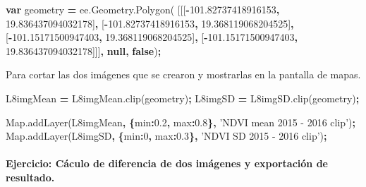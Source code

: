 \documentclass[
]{article}
\newenvironment{Shaded}{\begin{snugshade}}{\end{snugshade}}
\newcommand{\AttributeTok}[1]{\textcolor[rgb]{0.77,0.63,0.00}{#1}}
\newcommand{\DataTypeTok}[1]{\textcolor[rgb]{0.13,0.29,0.53}{#1}}
\newcommand{\DecValTok}[1]{\textcolor[rgb]{0.00,0.00,0.81}{#1}}
\newcommand{\FloatTok}[1]{\textcolor[rgb]{0.00,0.00,0.81}{#1}}
\newcommand{\KeywordTok}[1]{\textcolor[rgb]{0.13,0.29,0.53}{\textbf{#1}}}
\newcommand{\NormalTok}[1]{#1}
\newcommand{\OperatorTok}[1]{\textcolor[rgb]{0.81,0.36,0.00}{\textbf{#1}}}
\newcommand{\StringTok}[1]{\textcolor[rgb]{0.31,0.60,0.02}{#1}}
\newcommand{\VariableTok}[1]{\textcolor[rgb]{0.00,0.00,0.00}{#1}}
\begin{document}
\begin{Shaded}
\begin{Highlighting}[]
\KeywordTok{var}\NormalTok{ geometry }\OperatorTok{=} \VariableTok{ee}\NormalTok{.}\VariableTok{Geometry}\NormalTok{.}\AttributeTok{Polygon}\NormalTok{(}
\NormalTok{        [[[}\OperatorTok{-}\FloatTok{101.82737418916153}\OperatorTok{,} \FloatTok{19.836437094032178}\NormalTok{]}\OperatorTok{,}
\NormalTok{          [}\OperatorTok{-}\FloatTok{101.82737418916153}\OperatorTok{,} \FloatTok{19.368119068204525}\NormalTok{]}\OperatorTok{,}
\NormalTok{          [}\OperatorTok{-}\FloatTok{101.15171500947403}\OperatorTok{,} \FloatTok{19.368119068204525}\NormalTok{]}\OperatorTok{,}
\NormalTok{          [}\OperatorTok{-}\FloatTok{101.15171500947403}\OperatorTok{,} \FloatTok{19.836437094032178}\NormalTok{]]]}\OperatorTok{,} \KeywordTok{null}\OperatorTok{,} \KeywordTok{false}\NormalTok{)}\OperatorTok{;}
\end{Highlighting}
\end{Shaded}

Para cortar las dos imágenes que se crearon y mostrarlas en la pantalla
de mapas.

\begin{Shaded}
\begin{Highlighting}[]
\NormalTok{L8imgMean }\OperatorTok{=} \VariableTok{L8imgMean}\NormalTok{.}\AttributeTok{clip}\NormalTok{(geometry)}\OperatorTok{;}
\NormalTok{L8imgSD }\OperatorTok{=} \VariableTok{L8imgSD}\NormalTok{.}\AttributeTok{clip}\NormalTok{(geometry)}\OperatorTok{;}

\VariableTok{Map}\NormalTok{.}\AttributeTok{addLayer}\NormalTok{(L8imgMean}\OperatorTok{,} \OperatorTok{\{}\DataTypeTok{min}\OperatorTok{:}\FloatTok{0.2}\OperatorTok{,} \DataTypeTok{max}\OperatorTok{:}\FloatTok{0.8}\OperatorTok{\},} \StringTok{'NDVI mean 2015 - 2016 clip'}\NormalTok{)}\OperatorTok{;}
\VariableTok{Map}\NormalTok{.}\AttributeTok{addLayer}\NormalTok{(L8imgSD}\OperatorTok{,} \OperatorTok{\{}\DataTypeTok{min}\OperatorTok{:}\DecValTok{0}\OperatorTok{,} \DataTypeTok{max}\OperatorTok{:}\FloatTok{0.3}\OperatorTok{\},} \StringTok{'NDVI SD 2015 - 2016 clip'}\NormalTok{)}\OperatorTok{;}
\end{Highlighting}
\end{Shaded}

\hypertarget{ejercicio-cuxe1culo-de-diferencia-de-dos-imuxe1genes-y-exportaciuxf3n-de-resultado.}{%
\paragraph{Ejercicio: Cáculo de diferencia de dos imágenes y exportación
de
resultado.}\label{ejercicio-cuxe1culo-de-diferencia-de-dos-imuxe1genes-y-exportaciuxf3n-de-resultado.}}
\end{document}
